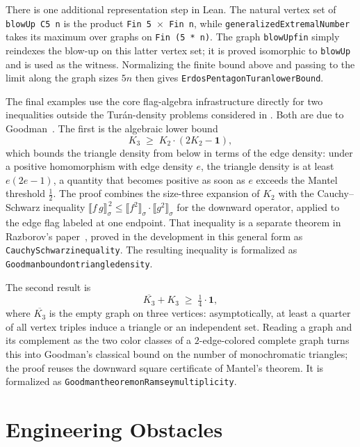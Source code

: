 \documentclass[acmsmall,screen=true,acmthm=false]{acmart}
\newcommand{\boldparagraph}[1]{\noindentparagraph{\textnormal{\textbf{#1}}}}
\DeclareRobustCommand{\lean}[1]{{\def\_{\textunderscore\allowbreak}\texttt{#1}}}
\begin{document}
There is one additional representation step in Lean.  The natural vertex set
of \lean{blowUp C5 n} is the product \lean{Fin 5 $\times$ Fin n}, while
\lean{generalizedExtremalNumber} takes its maximum over graphs on
\lean{Fin (5 * n)}.  The graph \lean{blowUp\_fin} simply reindexes the blow-up
on this latter vertex set; it is proved isomorphic to \lean{blowUp} and is used
as the witness.  Normalizing the finite bound above and passing to the limit
along the graph sizes $5n$ then gives
\lean{ErdosPentagon\_Turan\_lowerBound}.

\boldparagraph{Direct Goodman inequalities.}
The final examples use the core flag-algebra infrastructure directly for two
inequalities outside the Tur\'an-density problems considered in
.  Both are due to Goodman~\cite{goodman1959}.
The first is the algebraic lower bound
\[
  K_3 \;\geq\; K_2\cdot(2K_2-\mathbf{1}),
\]
which bounds the triangle density from below in terms of the edge density:
under a positive homomorphism with edge density $e$, the triangle density is
at least $e(2e-1)$, a quantity that becomes positive as soon as $e$ exceeds
the Mantel threshold $\tfrac12$.  The proof combines the size-three expansion
of $K_2$ with the Cauchy--Schwarz inequality
$\llbracket f\,g\rrbracket_\sigma^{\,2}\leq
\llbracket f^2\rrbracket_\sigma\cdot\llbracket g^2\rrbracket_\sigma$ for the
downward operator, applied to the edge flag labeled at one endpoint.  That
inequality is a separate theorem in Razborov's
paper~\cite{razborov2007flag}, proved in the development in this general form
as \lean{Cauchy\_\allowbreak Schwarz\_\allowbreak inequality}.  The resulting inequality is
formalized as
\lean{Goodman\_\allowbreak bound\_\allowbreak on\_\allowbreak triangle\_\allowbreak density}.

The second result is
\[
  \overline{K_3} + K_3 \;\geq\; \tfrac14\cdot\mathbf{1},
\]
where $\overline{K_3}$ is the empty graph on three vertices: asymptotically,
at least a quarter of all
vertex triples induce a triangle or an independent set.  Reading a graph and
its complement as the two color classes of a $2$-edge-colored complete graph
turns this into Goodman's classical bound on the number of monochromatic
triangles; the proof reuses the downward square certificate of Mantel's
theorem.  It is formalized as
\lean{Goodman\_theorem\_on\_Ramsey\_multiplicity}.

\section{Engineering Obstacles}
\label{sec:obstacles}
\end{document}
